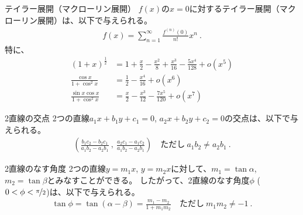 




\begin{Formula}[label=formula:taylorexpansion]{テイラー展開（マクローリン展開）}
$f(x)$の$x = 0$に対するテイラー展開（マクローリン展開）は、以下で与えられる。
\begin{align*}
  f(x) = \sum_{n=1}^{\infty}\frac{f^{(n)}(0)}{n!}x^n\ .
\end{align*}
特に、
\begin{align*}
  (1+x)^\frac12 &= 1+\frac x2-\frac{x^2}8+\frac{x^3}{16}-\frac{5x^4}{128}+o\!\left(x^5\right)\\
  \frac{\cos x}{1+\cos^2x} &= \frac12-\frac{x^4}{16}+o\left(x^6\right)\\
  \frac{\sin x\cos x}{1+\cos^2x} &= \frac x2-\frac{x^3}{12}-\frac{7x^5}{120}+o\left(x^7\right)
\end{align*}
\end{Formula}



\begin{Formula}[label=formula:intersectionof2lines]{2直線の交点}
2つの直線$a_1x+b_1y+c_1 = 0$, $a_2x+b_2y+c_2 = 0$の交点は、以下で与えられる。
\begin{align*}
  \left(
  \frac{b_1c_2-b_2c_1}{a_1b_2-a_2b_1}~,~
  \frac{a_2c_1-a_1c_2}{a_1b_2-a_2b_1}
  \right)
  \quad\text{ただし}~
  a_1b_2 \ne a_2b_1\ .
\end{align*}
\end{Formula}

\begin{Formula}[label=formula:intersectionof2lines]{2直線のなす角度}
2つの直線$y = m_1x$, $y = m_2x$に対して、$m_1 = \tan\alpha$, $m_2 = \tan\beta$とみなすことができる。
したがって、2直線のなす角度$\phi$ ($0 < \phi < \nicefrac\pi2$)は、以下で与えられる。
\begin{align*}
  \tan\phi = \tan(\alpha-\beta) = \frac{m_1-m_2}{1+m_1m_2}
  \quad\text{ただし}~
  m_1m_2 \ne -1\ .
\end{align*}
\end{Formula}



